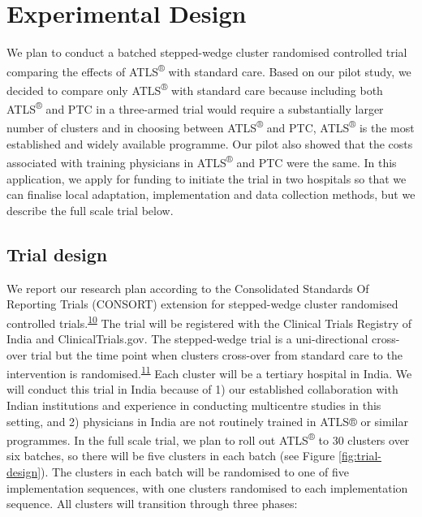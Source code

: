 \documentclass[
  11pt,
]{article}
\begin{document}
\hypertarget{experimental-design}{%
\section{Experimental Design}\label{experimental-design}}

We plan to conduct a batched stepped-wedge cluster randomised controlled trial comparing the effects of ATLS\textsuperscript{®} with standard care. Based on our pilot study, we decided to compare only ATLS\textsuperscript{®} with standard care because including both ATLS\textsuperscript{®} and PTC in a three-armed trial would require a substantially larger number of clusters and in choosing between ATLS\textsuperscript{®} and PTC, ATLS\textsuperscript{®} is the most established and widely available programme. Our pilot also showed that the costs associated with training physicians in ATLS\textsuperscript{®} and PTC were the same. In this application, we apply for funding to initiate the trial in two hospitals so that we can finalise local adaptation, implementation and data collection methods, but we describe the full scale trial below.

\hypertarget{trial-design}{%
\subsection{Trial design}\label{trial-design}}

We report our research plan according to the Consolidated Standards Of Reporting Trials (CONSORT) extension for stepped-wedge cluster randomised controlled trials.\textsuperscript{\protect\hyperlink{ref-Hemming2018}{10}} The trial will be registered with the Clinical Trials Registry of India and ClinicalTrials.gov. The stepped-wedge trial is a uni-directional cross-over trial but the time point when clusters cross-over from standard care to the intervention is randomised.\textsuperscript{\protect\hyperlink{ref-Hemming2015}{11}} Each cluster will be a tertiary hospital in India. We will conduct this trial in India because of 1) our established collaboration with Indian institutions and experience in conducting multicentre studies in this setting, and 2) physicians in India are not routinely trained in ATLS® or similar programmes. In the full scale trial, we plan to roll out ATLS\textsuperscript{®} to 30 clusters over six batches, so there will be five clusters in each batch (see Figure \ref{fig:trial-design}). The clusters in each batch will be randomised to one of five implementation sequences, with one clusters randomised to each implementation sequence. All clusters will transition through three phases:
\end{document}

